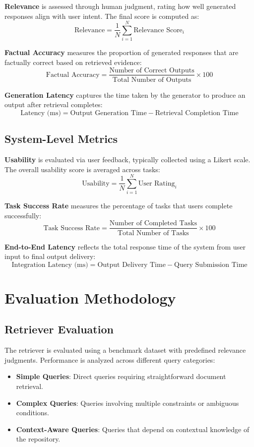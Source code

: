 \textbf{Relevance} is assessed through human judgment, rating how well generated responses align with user intent. The final score is computed as:
\[
\text{Relevance} =
\frac{1}{N} \sum_{i=1}^{N} \text{Relevance Score}_i
\]

\textbf{Factual Accuracy} measures the proportion of generated responses that are factually correct based on retrieved evidence:
\[
\text{Factual Accuracy} =
\frac{\text{Number of Correct Outputs}}
{\text{Total Number of Outputs}} \times 100
\]

\textbf{Generation Latency} captures the time taken by the generator to produce an output after retrieval completes:
\[
\text{Latency (ms)} = \text{Output Generation Time} - \text{Retrieval Completion Time}
\]

\subsection{System-Level Metrics}

\textbf{Usability} is evaluated via user feedback, typically collected using a Likert scale. The overall usability score is averaged across tasks:
\[
\text{Usability} =
\frac{1}{N} \sum_{i=1}^{N} \text{User Rating}_i
\]

\textbf{Task Success Rate} measures the percentage of tasks that users complete successfully:
\[
\text{Task Success Rate} =
\frac{\text{Number of Completed Tasks}}
{\text{Total Number of Tasks}} \times 100
\]

\textbf{End-to-End Latency} reflects the total response time of the system from user input to final output delivery:
\[
\text{Integration Latency (ms)} =
\text{Output Delivery Time} - \text{Query Submission Time}
\]

\section{Evaluation Methodology}

\subsection{Retriever Evaluation}

The retriever is evaluated using a benchmark dataset with predefined relevance judgments. Performance is analyzed across different query categories:
\begin{itemize}
    \item \textbf{Simple Queries}: Direct queries requiring straightforward document retrieval.
    \item \textbf{Complex Queries}: Queries involving multiple constraints or ambiguous conditions.
    \item \textbf{Context-Aware Queries}: Queries that depend on contextual knowledge of the repository.
\end{itemize}

